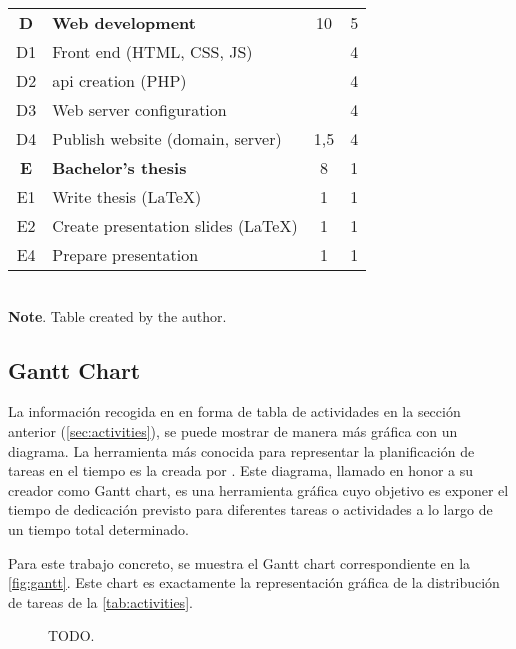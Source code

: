\begin{table}[p]
\begin{tabular}{cp{}cc}
    \textbf{D} & \textbf{Web development}         & 10  & 5 \\
    D1         & Front end (HTML, CSS, JS)        &     & 4 \\
    D2         & \Acs{api} creation  (PHP)        &     & 4 \\
    D3         & Web server configuration         &     & 4 \\
    D4         & Publish website (domain, server) & 1,5 & 4 \\
    \midrule

    \rowcolor{rowColor}
    \textbf{E} & \textbf{Bachelor's thesis} & 8 & 1 \\
    \rowcolor{rowColor}
    E1         & Write thesis (\LaTeX)       & 1 & 1 \\
    \rowcolor{rowColor}
    \rowcolor{rowColor}
    E2         & Create presentation slides (\LaTeX) & 1 & 1 \\
    \rowcolor{rowColor}
    E4         & Prepare presentation       & 1 & 1 \\
    \bottomrule
  \end{tabular} \\[1.25ex]
  {\small\textbf{Note}. Table created by the author.}
\end{table}


\subsection{Gantt Chart}\label{sec:gantt}

La información recogida en en forma de tabla de actividades en la sección
anterior (\vref{sec:activities}), se puede mostrar de manera más gráfica con un
diagrama. La herramienta más conocida para representar la planificación de
tareas en el tiempo es la creada por
. Este diagrama, llamado en
honor a su creador como Gantt chart, es una herramienta gráfica cuyo objetivo
es exponer el tiempo de dedicación previsto para diferentes tareas o
actividades a lo largo de un tiempo total determinado.

Para este trabajo concreto, se muestra el Gantt chart correspondiente en la
\vref{fig:gantt}. Este chart es exactamente la representación gráfica de la
distribución de tareas de la \vref{tab:activities}.

\begin{figure}[ht]
  \centering
  
    \caption[TODO]{TODO.}\label{fig:gantt}
\end{figure}



